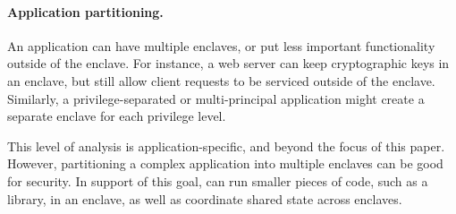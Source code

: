 \paragraph{Application partitioning.} An application can have multiple
enclaves, or put less important functionality outside of the enclave.
For instance, a web server can keep cryptographic keys in an enclave,
but still allow client requests to be serviced outside of the enclave.
Similarly, a privilege-separated or multi-principal application might create a separate enclave for
each privilege level.

This level of analysis is application-specific, and beyond the focus of this paper.
However, partitioning a complex application into multiple enclaves
can be good for security. In support of this goal,
\graphenesgx{} can run smaller pieces of code, such as a library, in an enclave, as well as
coordinate shared state across enclaves.



\begin{comment}
\fixmedp{Did a first cut at 2.2; needs to integrate the figure (or drop it).  I didn't know what to write for 2.3 yet.  I left the old text below for now (if there is anything you really want to save), but it needs to go away}

\subsection{Open Challenges}

\fixmedp{Here, I would give a taste of some of the issues we solve and why they are hard, like dynamic loading (and maybe fork or IPC).  Keep it short, a few paragraphs.}
\end{comment}



